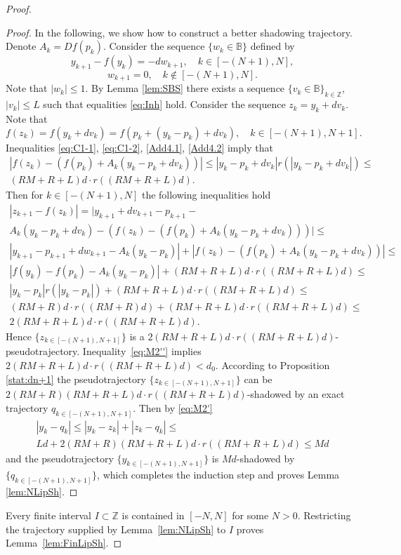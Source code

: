 \documentclass[12pt]{article}
\newcommand{\Bb}{\mathbb{B}}
\newcommand{\Zz}{\mathbb{Z}}
\theoremstyle{definition}
\begin{document}
\begin{proof}
\begin{proof}
In the following, we show how to construct a better shadowing trajectory.
Denote $A_k = Df(p_k)$. Consider the sequence $\{w_k \in \Bb\}$ defined by
$$
y_{k+1} - f(y_k) = - d w_{k+1}, \quad k \in [-(N+1), N], 
$$
$$
w_{k+1} = 0, \quad k \notin [-(N+1), N].
$$
Note that $|w_k| \leq 1$.
By Lemma \ref{lem:SBS} there exists a sequence $\{v_k \in \Bb\}_{k \in \Zz}$, $|v_k| \leq L$ such that equalities \eqref{eq:Inh} hold.
Consider the sequence $z_k = y_k + dv_k$. Note that 
$$
f(z_k) = f(y_k + dv_k) = f(p_k + (y_k-p_k) +dv_k), \quad k \in [-(N+1), N+1].
$$
Inequalities \eqref{eq:C1-1}, \eqref{eq:C1-2}, \eqref{Add4.1}, \eqref{Add4.2} imply that
\begin{multline*}
|f(z_k) - (f(p_k) + A_k (y_k - p_k + dv_k) )| \leq |y_k - p_k + dv_k|r(|y_k - p_k + dv_k|) \leq \\ (RM+R+L)d \cdot r\left((RM+R+L)d\right).    
\end{multline*}
Then for $k \in [-(N+1), N]$ the following inequalities hold
\begin{multline*}
|z_{k+1} - f(z_k)| = |y_{k+1} + dv_{k+1} - p_{k+1} - \\ A_k (y_k - p_k + dv_k) - (f(z_k) - (f(p_k) + A_k (y_k - p_k + dv_k) ))|  \leq \\  
|y_{k+1}  - p_{k+1} + dw_{k+1} - A_k (y_k - p_k)| +|f(z_k) - (f(p_k) + A_k (y_k - p_k + dv_k) )| \leq \\  
|f(y_k) - f(p_k) - A_k (y_k - p_k)| + (RM+R+L)d \cdot r\left((RM+R+L)d\right) \leq \\
|y_k - p_k|r(|y_k - p_k|) + (RM+R+L)d \cdot r\left((RM+R+L)d\right) \leq \\ 
(RM+R)d\cdot r((RM+R)d) + (RM+R+L)d \cdot r\left((RM+R+L)d\right) \leq \\
2 (RM+R+L)d \cdot r\left((RM+R+L)d\right).
\end{multline*}
Hence $\{z_{k \in [-(N+1), N+1]}\}$ is a $2 (RM+R+L)d \cdot r\left((RM+R+L)d\right)$-pseudotrajectory. Inequality~\eqref{eq:M2''} implies 
$
2 (RM+R+L)d \cdot r\left((RM+R+L)d\right) < d_0
$.
According to Proposition \ref{stat:dn+1} the pseudotrajectory $\{z_{k \in [-(N+1), N+1]}\}$ can be $2(RM+R)(RM+R+L)d \cdot r\left((RM+R+L)d\right)$-shadowed by an exact trajectory $q_{k \in [-(N+1), N+1]}$. Then by \eqref{eq:M2'}
\begin{multline*}
|y_k - q_k| \leq |y_k - z_k| + |z_k-q_k| \leq \\ Ld + 2(RM+R)(RM+R+L)d \cdot r\left((RM+R+L)d\right) \leq Md    
\end{multline*}
and the pseudotrajectory $\{y_{k \in [-(N+1), N+1]}\}$ is $Md$-shadowed by $\{q_{k \in [-(N+1), N+1]}\}$, which completes the induction step and proves Lemma \ref{lem:NLipSh}.
\end{proof}

Every finite interval $I\subset\Zz$ is contained in $[-N,N]$ for some $N>0$.
Restricting the trajectory supplied by Lemma~\ref{lem:NLipSh} to $I$ proves Lemma~\ref{lem:FinLipSh}.
\end{proof}
\end{document}
